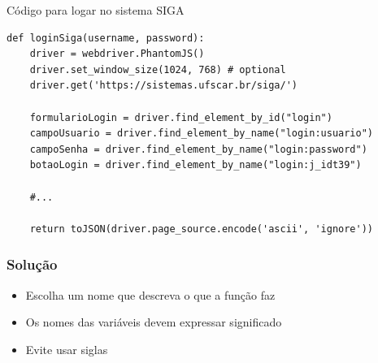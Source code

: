 \begin{frame}[fragile]

	\begin{listing}[H]
		\caption{Código para logar no sistema SIGA}
		\begin{verbatim}
def loginSiga(username, password):
	driver = webdriver.PhantomJS()
	driver.set_window_size(1024, 768) # optional
	driver.get('https://sistemas.ufscar.br/siga/')

	formularioLogin = driver.find_element_by_id("login")
	campoUsuario = driver.find_element_by_name("login:usuario")
	campoSenha = driver.find_element_by_name("login:password")
	botaoLogin = driver.find_element_by_name("login:j_idt39")

	#...

	return toJSON(driver.page_source.encode('ascii', 'ignore'))
		\end{verbatim}
	\end{listing}

\end{frame}


\begin{frame}
	\frametitle{Solução}
	\begin{itemize}
		\item Escolha um nome que descreva o que a função faz
		\item Os nomes das variáveis devem expressar significado
		\item Evite usar siglas
	\end{itemize}
\end{frame}
